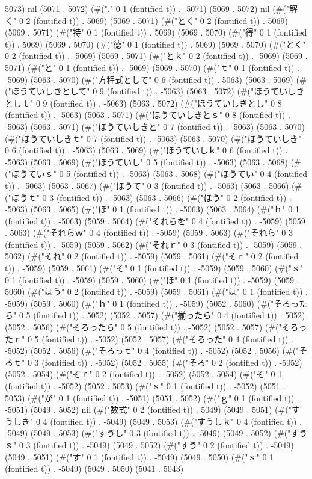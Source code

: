 5073) nil (5071 . 5072) (#("." 0 1 (fontified t)) . -5071) (5069 . 5072) nil (#("解く" 0 2 (fontified t)) . 5069) (5069 . 5071) (#("とく" 0 2 (fontified t)) . 5069) (5069 . 5071) (#("特" 0 1 (fontified t)) . 5069) (5069 . 5070) (#("得" 0 1 (fontified t)) . 5069) (5069 . 5070) (#("徳" 0 1 (fontified t)) . 5069) (5069 . 5070) (#("とく" 0 2 (fontified t)) . -5069) (5069 . 5071) (#("とｋ" 0 2 (fontified t)) . -5069) (5069 . 5071) (#("と" 0 1 (fontified t)) . -5069) (5069 . 5070) (#("ｔ" 0 1 (fontified t)) . -5069) (5063 . 5070) (#("方程式として" 0 6 (fontified t)) . 5063) (5063 . 5069) (#("ほうていしきとして" 0 9 (fontified t)) . -5063) (5063 . 5072) (#("ほうていしきとしｔ" 0 9 (fontified t)) . -5063) (5063 . 5072) (#("ほうていしきとし" 0 8 (fontified t)) . -5063) (5063 . 5071) (#("ほうていしきとｓ" 0 8 (fontified t)) . -5063) (5063 . 5071) (#("ほうていしきと" 0 7 (fontified t)) . -5063) (5063 . 5070) (#("ほうていしきｔ" 0 7 (fontified t)) . -5063) (5063 . 5070) (#("ほうていしき" 0 6 (fontified t)) . -5063) (5063 . 5069) (#("ほうていしｋ" 0 6 (fontified t)) . -5063) (5063 . 5069) (#("ほうていし" 0 5 (fontified t)) . -5063) (5063 . 5068) (#("ほうていｓ" 0 5 (fontified t)) . -5063) (5063 . 5068) (#("ほうてい" 0 4 (fontified t)) . -5063) (5063 . 5067) (#("ほうて" 0 3 (fontified t)) . -5063) (5063 . 5066) (#("ほうｔ" 0 3 (fontified t)) . -5063) (5063 . 5066) (#("ほう" 0 2 (fontified t)) . -5063) (5063 . 5065) (#("ほ" 0 1 (fontified t)) . -5063) (5063 . 5064) (#("ｈ" 0 1 (fontified t)) . -5063) (5059 . 5064) (#("それらを" 0 4 (fontified t)) . -5059) (5059 . 5063) (#("それらｗ" 0 4 (fontified t)) . -5059) (5059 . 5063) (#("それら" 0 3 (fontified t)) . -5059) (5059 . 5062) (#("それｒ" 0 3 (fontified t)) . -5059) (5059 . 5062) (#("それ" 0 2 (fontified t)) . -5059) (5059 . 5061) (#("そｒ" 0 2 (fontified t)) . -5059) (5059 . 5061) (#("そ" 0 1 (fontified t)) . -5059) (5059 . 5060) (#("ｓ" 0 1 (fontified t)) . -5059) (5059 . 5060) (#("ほ" 0 1 (fontified t)) . -5059) (5059 . 5060) (#("ほう" 0 2 (fontified t)) . -5059) (5059 . 5061) (#("ほ" 0 1 (fontified t)) . -5059) (5059 . 5060) (#("ｈ" 0 1 (fontified t)) . -5059) (5052 . 5060) (#("そろったら" 0 5 (fontified t)) . 5052) (5052 . 5057) (#("揃ったら" 0 4 (fontified t)) . 5052) (5052 . 5056) (#("そろったら" 0 5 (fontified t)) . -5052) (5052 . 5057) (#("そろったｒ" 0 5 (fontified t)) . -5052) (5052 . 5057) (#("そろった" 0 4 (fontified t)) . -5052) (5052 . 5056) (#("そろっｔ" 0 4 (fontified t)) . -5052) (5052 . 5056) (#("そろｔ" 0 3 (fontified t)) . -5052) (5052 . 5055) (#("そろ" 0 2 (fontified t)) . -5052) (5052 . 5054) (#("そｒ" 0 2 (fontified t)) . -5052) (5052 . 5054) (#("そ" 0 1 (fontified t)) . -5052) (5052 . 5053) (#("ｓ" 0 1 (fontified t)) . -5052) (5051 . 5053) (#("が" 0 1 (fontified t)) . -5051) (5051 . 5052) (#("ｇ" 0 1 (fontified t)) . -5051) (5049 . 5052) nil (#("数式" 0 2 (fontified t)) . 5049) (5049 . 5051) (#("すうしき" 0 4 (fontified t)) . -5049) (5049 . 5053) (#("すうしｋ" 0 4 (fontified t)) . -5049) (5049 . 5053) (#("すうし" 0 3 (fontified t)) . -5049) (5049 . 5052) (#("すうｓ" 0 3 (fontified t)) . -5049) (5049 . 5052) (#("すう" 0 2 (fontified t)) . -5049) (5049 . 5051) (#("す" 0 1 (fontified t)) . -5049) (5049 . 5050) (#("ｓ" 0 1 (fontified t)) . -5049) (5049 . 5050) (5041 . 5043) 